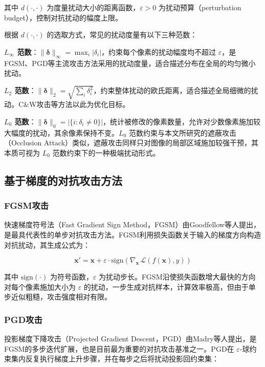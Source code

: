 其中 $d(\cdot, \cdot)$ 为度量扰动大小的距离函数，$\varepsilon > 0$ 为扰动预算（perturbation budget），控制对抗扰动的幅度上限。

根据 $d(\cdot, \cdot)$ 的选取方式，常见的扰动度量有以下三种范数：

\textbf{$L_\infty$ 范数}：$\|\boldsymbol{\delta}\|_\infty = \max_i |\delta_i|$，约束每个像素的扰动幅度均不超过 $\varepsilon$，是FGSM、PGD等主流攻击方法采用的扰动度量，适合描述分布在全局的均匀微小扰动。

\textbf{$L_2$ 范数}：$\|\boldsymbol{\delta}\|_2 = \sqrt{\sum_i \delta_i^2}$，约束整体扰动的欧氏距离，适合描述全局细微的扰动。C\&W攻击等方法以此为优化目标。

\textbf{$L_0$ 范数}：$\|\boldsymbol{\delta}\|_0 = \left|\{i : \delta_i \neq 0\}\right|$，统计被修改的像素数量，允许对少数像素施加较大幅度的扰动，其余像素保持不变。$L_0$ 范数约束与本文所研究的遮蔽攻击（Occlusion Attack）类似，遮蔽攻击同样只对图像的局部区域施加较强干预，其本质可视为 $L_0$ 范数约束下的一种极端扰动形式。

\subsection{基于梯度的对抗攻击方法}

\subsubsection*{FGSM攻击}

快速梯度符号法（Fast Gradient Sign Method，FGSM）由Goodfellow等人提出\cite{goodfellow2015fgsm}，是最具代表性的单步对抗攻击方法。FGSM利用损失函数关于输入的梯度方向构造对抗扰动，其生成公式为：

\begin{equation}
  \mathbf{x}' = \mathbf{x} + \varepsilon \cdot \text{sign}\!\left(\nabla_{\mathbf{x}}\, \mathcal{L}(f(\mathbf{x}), y)\right)
\end{equation}

其中 $\text{sign}(\cdot)$ 为符号函数，$\varepsilon$ 为扰动步长。FGSM沿使损失函数增大最快的方向对每个像素施加大小为 $\varepsilon$ 的扰动，一步生成对抗样本，计算效率极高，但由于单步近似粗糙，攻击强度相对有限。

\subsubsection*{PGD攻击}

投影梯度下降攻击（Projected Gradient Descent，PGD）由Madry等人提出\cite{madry2018pgd}，是FGSM的多步迭代扩展，也是目前最为重要的对抗攻击基准之一。PGD在 $\varepsilon$-球约束集内反复执行梯度上升步骤，并在每步之后将扰动投影回约束集：

